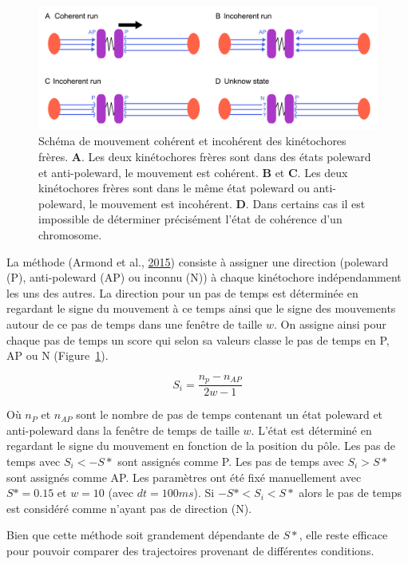 \documentclass[12pt,a4paper,twoside,openright]{book}
\begin{document}
\begin{figure}[htbp]
\centering
\includegraphics{figures/results/imaging/coherence_schema.png}
\caption[Schéma de mouvement cohérent et incohérent des kinétochores frères.]{\label{fig:coherence_schema}Schéma
de mouvement cohérent et incohérent des kinétochores frères. \textbf{A}.
Les deux kinétochores frères sont dans des états poleward et
anti-poleward, le mouvement est cohérent. \textbf{B} et \textbf{C}. Les
deux kinétochores frères sont dans le même état poleward ou
anti-poleward, le mouvement est incohérent. \textbf{D}. Dans certains
cas il est impossible de déterminer précisément l'état de cohérence d'un
chromosome.}
\end{figure}

La méthode (Armond et al., \hyperref[ref-Armond2015]{2015}) consiste à
assigner une direction (poleward (P), anti-poleward (AP) ou inconnu (N))
à chaque kinétochore indépendamment les uns des autres. La direction
pour un pas de temps est déterminée en regardant le signe du mouvement à
ce temps ainsi que le signe des mouvements autour de ce pas de temps
dans une fenêtre de taille \(w\). On assigne ainsi pour chaque pas de
temps un score qui selon sa valeurs classe le pas de temps en P, AP ou N
(Figure~\ref{fig:coherence_schema}).

\[
S_i = \frac{n_p - n_{AP}}{2w - 1}
\]

Où \(n_P\) et \(n_{AP}\) sont le nombre de pas de temps contenant un
état poleward et anti-poleward dans la fenêtre de temps de taille \(w\).
L'état est déterminé en regardant le signe du mouvement en fonction de
la position du pôle. Les pas de temps avec \(S_i < -S*\) sont assignés
comme P. Les pas de temps avec \(S_i > S*\) sont assignés comme AP. Les
paramètres ont été fixé manuellement avec \(S* = 0.15\) et \(w = 10\)
(avec \(dt=100ms\)). Si \(-S* < S_i < S*\) alors le pas de temps est
considéré comme n'ayant pas de direction (N).

Bien que cette méthode soit grandement dépendante de \(S*\), elle reste
efficace pour pouvoir comparer des trajectoires provenant de différentes
conditions.
\end{document}
